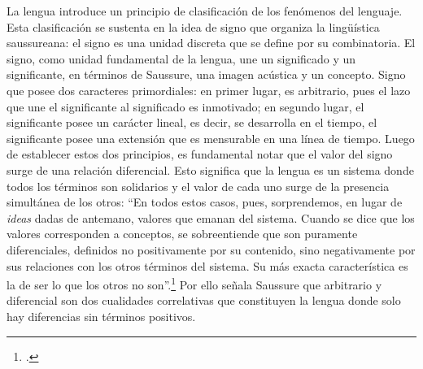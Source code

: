 \documentclass{book}
\begin{document}
La lengua introduce un principio de clasificación de los fenómenos del
lenguaje. Esta clasificación se sustenta en la idea de signo que
organiza la lingüística saussureana: el signo es una unidad discreta que
se define por su combinatoria. El signo, como unidad fundamental de la
lengua, une un significado y un significante, en términos de Saussure,
una imagen acústica y un concepto. Signo que posee dos caracteres
primordiales: en primer lugar, es arbitrario, pues el lazo que une el
significante al significado es inmotivado; en segundo lugar, el
significante posee un carácter lineal, es decir, se desarrolla en el
tiempo, el significante posee una extensión que es mensurable en una
línea de tiempo. Luego de establecer estos dos principios, es
fundamental notar que el valor del signo surge de una relación
diferencial. Esto significa que la lengua es un sistema donde todos los
términos son solidarios y el valor de cada uno surge de la presencia
simultánea de los otros: \enquote{En todos estos casos, pues, sorprendemos, en
lugar de \emph{ideas} dadas de antemano, valores que emanan del sistema.
Cuando se dice que los valores corresponden a conceptos, se
sobreentiende que son puramente diferenciales, definidos no
positivamente por su contenido, sino negativamente por sus relaciones
con los otros términos del sistema. Su más exacta característica es la
de ser lo que los otros no son}.\footcite[141]{saussure1945} Por ello señala
Saussure que arbitrario y diferencial son dos cualidades correlativas
que constituyen la lengua donde solo hay diferencias sin términos
positivos.
\end{document}
